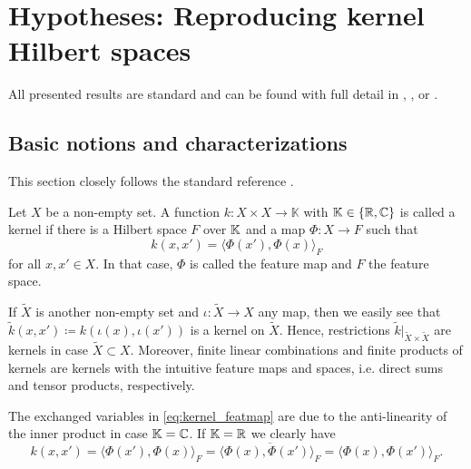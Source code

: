 \chapter{Hypotheses: Reproducing kernel Hilbert spaces}
\label{chapter:rkhs}

All presented results are standard and can be found with full 
detail in \cite[Chapters 4 and 5]{steinwart}, 
\cite[Chapter 1]{berlinet}, or \cite[Chapter 6 and 10]{wendland}.

\section{Basic notions and characterizations}

This section closely follows the standard reference 
\cite[Chapter 4]{steinwart}.

\begin{defn}
    Let $X$ be a non-empty set.
    A function $k \colon X \times X \to \mathbb K$
    with $\mathbb{K} \in \{ \mathbb{R}, \mathbb{C} \}$
    is called a kernel 
    if there is a Hilbert space $F$ over $\mathbb{K}$ 
    and a map $\Phi \colon X \to F$ such that
    \begin{equation} \label{eq:kernel_featmap}
        k(x,x') = \langle \Phi(x'), \Phi(x) \rangle_F
    \end{equation}
    for all $x,x' \in X$.
    In that case, $\Phi$ is called the feature map
    and $F$ the feature space.
\end{defn}

If $\tilde X$ is another non-empty set and $\iota \colon \tilde X \to X$ 
any map, then we easily see that 
$\tilde k(x,x') \coloneqq k(\iota(x), \iota(x'))$ 
is a kernel on $\tilde X$.
Hence, restrictions $\tilde k |_{\tilde X \times \tilde X}$
are kernels in case $\tilde X \subset X$.
Moreover, finite linear combinations and finite products of kernels
are kernels with the intuitive feature maps and spaces, i.e. direct
sums and tensor products, respectively.

The exchanged variables in \cref{eq:kernel_featmap} are due to the 
anti-linearity of the inner product in case $\mathbb{K} = \mathbb{C}$.
If $\mathbb{K} = \mathbb{R}$ we clearly have 
\begin{equation*}
    k(x,x') = \langle \Phi(x'), \Phi(x) \rangle_F 
    = \overline{\langle \Phi(x), \Phi(x') \rangle_F}
    = \langle \Phi(x), \Phi(x') \rangle_F.
\end{equation*}

